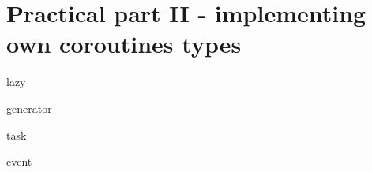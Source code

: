 \documentclass[10pt]{beamer}
\begin{document}
\section{Practical part II - implementing own coroutines types}

\begin{frame}{lazy}

\end{frame}

\begin{frame}{generator}

\end{frame}

\begin{frame}{task}

\end{frame}

\begin{frame}{event}

\end{frame}
\end{document}
